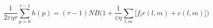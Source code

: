 \begin{small}
\begin{equation*}
\frac{1}{2\varepsilon\eta \tau }\sum_{p=0 }^{\tau - 1} h(p)    = (\tau - 1)NB\Big( 1 +\frac{1}{\varepsilon\eta}  \sum_{l,m}\big[f_{l}r(l,m) + c(l,m)\big]\Big)
\end{equation*}
\end{small}













